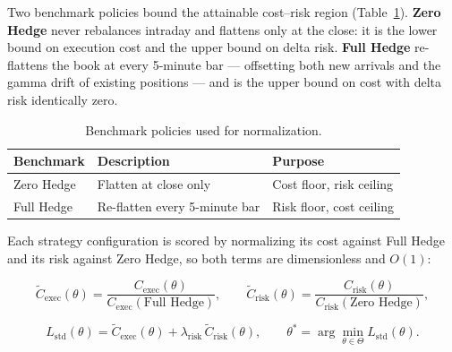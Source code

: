 \documentclass{article}
\begin{document}
Two benchmark policies bound the attainable cost--risk region
(Table~\ref{tab:benchmarks}). \textbf{Zero Hedge} never rebalances intraday and flattens
only at the close: it is the lower bound on execution cost and the upper bound on delta
risk. \textbf{Full Hedge} re-flattens the book at every 5-minute bar --- offsetting both
new arrivals and the gamma drift of existing positions --- and is the upper bound on cost
with delta risk identically zero.

\begin{table}[htbp]
\centering
\small
\begin{tabular}{lll}
\toprule
\textbf{Benchmark} & \textbf{Description} & \textbf{Purpose} \\
\midrule
Zero Hedge & Flatten at close only & Cost floor, risk ceiling \\
Full Hedge & Re-flatten every 5-minute bar & Risk floor, cost ceiling \\
\bottomrule
\end{tabular}
\caption{Benchmark policies used for normalization.}
\label{tab:benchmarks}
\end{table}

Each strategy configuration is scored by normalizing its cost against Full Hedge and its
risk against Zero Hedge, so both terms are dimensionless and $O(1)$:

\begin{eqbox}
\begin{equation}
\widetilde{C}_{\text{exec}}(\theta) = \frac{C_{\text{exec}}(\theta)}{C_{\text{exec}}(\text{Full Hedge})},
\qquad
\widetilde{C}_{\text{risk}}(\theta) = \frac{C_{\text{risk}}(\theta)}{C_{\text{risk}}(\text{Zero Hedge})},
\end{equation}
\end{eqbox}

\begin{eqbox}
\begin{equation}
L_{\text{std}}(\theta) = \widetilde{C}_{\text{exec}}(\theta)
+ \lambda_{\text{risk}}\,\widetilde{C}_{\text{risk}}(\theta),
\qquad
\theta^{*} = \arg\min_{\theta \in \Theta} L_{\text{std}}(\theta).
\end{equation}
\end{eqbox}
\end{document}
